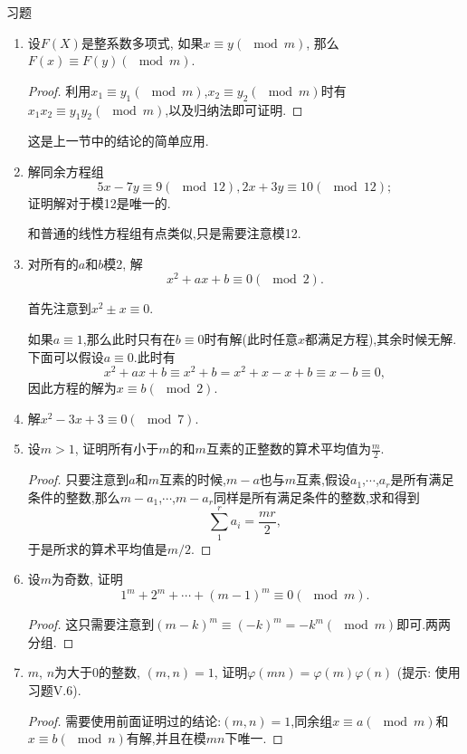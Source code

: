 \documentclass[12pt,a4paper]{book} %
\theoremstyle{remark}
\theoremstyle{example}
\theoremstyle{lemma}
\theoremstyle{corollary}
\numberwithin{theorem}{chapter}
\begin{document}
习题

\begin{enumerate}
\item 设$F(X)$是整系数多项式, 如果$x \equiv y (\mod m)$, 那么$F(x) \equiv F(y) (\mod m)$.

\begin{proof}
利用$x_1 \equiv y_1 (\mod m)$,$x_2 \equiv y_2 (\mod m)$时有$x_1x_2 \equiv y_1y_2 (\mod m)$,以及归纳法即可证明.
\end{proof}

这是上一节中的结论的简单应用.

\item 解同余方程组
\[
5x - 7y \equiv 9 (\mod 12), 2x + 3y \equiv 10 (\mod 12);
\]
证明解对于模12是唯一的.

和普通的线性方程组有点类似,只是需要注意模12.

\item 对所有的$a$和$b$模2, 解
\[
x^2 + ax + b \equiv 0 (\mod 2).
\]

首先注意到$x^2 \pm x \equiv 0$.

如果$a \equiv 1$,那么此时只有在$b \equiv 0$时有解(此时任意$x$都满足方程),其余时候无解.下面可以假设$a \equiv 0$.此时有
\[
x^2 + ax + b \equiv x^2 + b = x^2+x -x+b \equiv x-b \equiv 0,
\]
因此方程的解为$x \equiv b(\mod{2})$.

\item 解$x^2 - 3x + 3 \equiv 0 (\mod 7)$.

\item 设$m > 1$, 证明所有小于$m$的和$m$互素的正整数的算术平均值为$\frac{m}{2}$.

\begin{proof}
只要注意到$a$和$m$互素的时候,$m-a$也与$m$互素,假设$a_1$,$\cdots$,$a_r$是所有满足条件的整数,那么$m-a_1$,$\cdots$,$m-a_r$同样是所有满足条件的整数,求和得到
\[
\sum_{1}^{r}{a_i} = \frac{mr}{2},
\]
于是所求的算术平均值是$m/2$.
\end{proof}

\item 设$m$为奇数, 证明
\[
1^m + 2^m + \cdots + (m - 1)^m \equiv 0 (\mod m).
\]

\begin{proof}
这只需要注意到$(m-k)^m \equiv (-k)^m = -k^m(\mod{m})$即可.两两分组.
\end{proof}

\item $m$, $n$为大于0的整数, $(m, n) = 1$, 证明$\varphi(mn) = \varphi(m) \varphi(n)$ (提示: 使用习题V.6).

\begin{proof}
需要使用前面证明过的结论:$(m,n)=1$,同余组$x \equiv a(\mod m)$和$x \equiv b(\mod n)$有解,并且在模$mn$下唯一.


\end{proof}
\end{enumerate}
\end{document}
